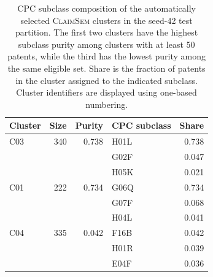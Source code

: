\begin{table}[t]
\centering
\small
\caption{CPC subclass composition of the automatically selected \textsc{ClaimSem} clusters in the seed-42 test partition. The first two clusters have the highest subclass purity among clusters with at least 50 patents, while the third has the lowest purity among the same eligible set. Share is the fraction of patents in the cluster assigned to the indicated subclass. Cluster identifiers are displayed using one-based numbering.}
\label{tab:cluster_composition}
\setlength{\tabcolsep}{4pt}
\renewcommand{\arraystretch}{1.12}
\begin{tabular}{@{}lrrlr@{}}
\toprule
\textbf{Cluster} & \textbf{Size} & \textbf{Purity} & \textbf{CPC subclass} & \textbf{Share} \\
\midrule
C03 & 340 & 0.738 & H01L & 0.738 \\
 &  &  & G02F & 0.047 \\
 &  &  & H05K & 0.021 \\
\addlinespace
C01 & 222 & 0.734 & G06Q & 0.734 \\
 &  &  & G07F & 0.068 \\
 &  &  & H04L & 0.041 \\
\addlinespace
C04 & 335 & 0.042 & F16B & 0.042 \\
 &  &  & H01R & 0.039 \\
 &  &  & E04F & 0.036 \\
\bottomrule
\end{tabular}
\end{table}
